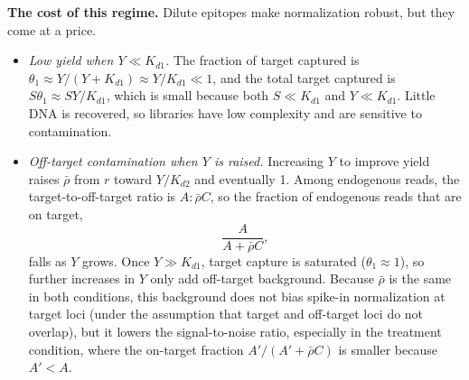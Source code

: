\textbf{The cost of this regime.} Dilute epitopes make normalization
robust, but they come at a price.
\begin{itemize}
    \item \emph{Low yield when $Y\ll K_{d1}$.} The fraction of target
    captured is $\theta_1\approx Y/(Y+K_{d1})\approx Y/K_{d1}\ll1$, and the
    total target captured is $S\theta_1\approx SY/K_{d1}$, which is small
    because both $S\ll K_{d1}$ and $Y\ll K_{d1}$. Little DNA is recovered,
    so libraries have low complexity and are sensitive to contamination.
    \item \emph{Off-target contamination when $Y$ is raised.} Increasing $Y$
    to improve yield raises $\bar\rho$ from $r$ toward $Y/K_{d2}$ and
    eventually 1. Among endogenous reads, the target-to-off-target ratio is
    $A:\bar\rho C$, so the fraction of endogenous reads that are on target,
    $$
    \frac{A}{A+\bar\rho C},
    $$
    falls as $Y$ grows. Once $Y\gg K_{d1}$, target capture is saturated
    ($\theta_1\approx1$), so further increases in $Y$ only add off-target
    background. Because $\bar\rho$ is the same in both conditions, this
    background does not bias spike-in normalization at target loci (under
    the assumption that target and off-target loci do not overlap), but it
    lowers the signal-to-noise ratio, especially in the treatment
    condition, where the on-target fraction $A'/(A'+\bar\rho C)$ is
    smaller because $A'<A$.
\end{itemize}
